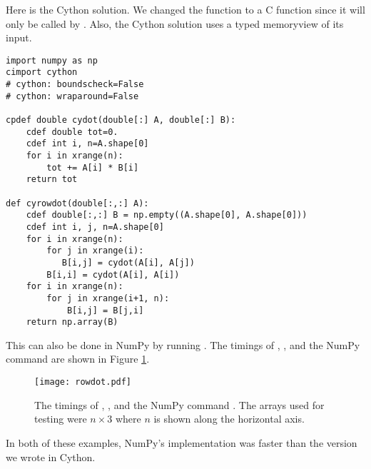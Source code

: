 Here is the Cython solution.
We changed the function  to a C function since it will only be called by .
Also, the Cython solution uses a typed memoryview of its input.

\begin{lstlisting}
import numpy as np
cimport cython
# cython: boundscheck=False
# cython: wraparound=False

cpdef double cydot(double[:] A, double[:] B):
    cdef double tot=0.
    cdef int i, n=A.shape[0]
    for i in xrange(n):
        tot += A[i] * B[i]
    return tot

def cyrowdot(double[:,:] A):
    cdef double[:,:] B = np.empty((A.shape[0], A.shape[0]))
    cdef int i, j, n=A.shape[0]
    for i in xrange(n):
        for j in xrange(i):
           B[i,j] = cydot(A[i], A[j])
        B[i,i] = cydot(A[i], A[i])
    for i in xrange(n):
        for j in xrange(i+1, n):
            B[i,j] = B[j,i]
    return np.array(B)
\end{lstlisting}

This can also be done in NumPy by running .
The timings of , , and the NumPy command  are shown in Figure \ref{cython:rowdot}.

\begin{figure}
\centering
\texttt{[image: rowdot.pdf]}
\caption{The timings of , , and the NumPy command .
The arrays used for testing were $n\times 3$ where $n$ is shown along the horizontal axis.}
\label{cython:rowdot}
\end{figure}

In both of these examples, NumPy's implementation was faster than the version we wrote in Cython.

